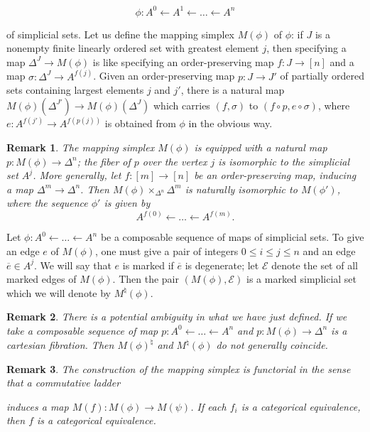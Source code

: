 \documentclass[12pt]{amsart}
\newcommand{\8}{\ensuremath{\infty}}
\newtheorem{remark}{Remark}
\begin{document}
$$
  \phi:A^0\leftarrow A^1\leftarrow \dots \leftarrow A^n
$$

of simplicial sets. Let us define the mapping simplex $M(\phi)$ of $\phi$: if $J$ is a nonempty finite linearly ordered set with greatest element $j$, then specifying a map $\Delta^J\rightarrow M(\phi)$ is like specifying an order-preserving map $f:J\rightarrow [n]$ and a map $\sigma:\Delta^J\rightarrow A^{f(j)}$. Given an order-preserving map $p:J\rightarrow J'$ of partially ordered sets containing largest elements $j$ and $j'$, there is a natural map $M(\phi)(\Delta^{J'})\rightarrow M(\phi)(\Delta^J)$ which carries $(f,\sigma)$ to $(f\circ p, e\circ\sigma)$, where $e:A^{f(j')}\rightarrow A^{f(p(j))}$ is obtained from $\phi$ in the obvious way.

\begin{remark}
  The mapping simplex $M(\phi)$ is equipped with a natural map $p:M(\phi)\rightarrow \Delta^n$; the fiber of $p$ over the vertex $j$ is isomorphic to the simplicial set $A^j$. More generally, let $f:[m]\rightarrow [n]$ be an order-preserving map, inducing a map $\Delta^m\rightarrow \Delta^n$. Then $M(\phi)\times_{\Delta^n}\Delta^m$ is naturally isomorphic to $M(\phi')$, where the sequence $\phi'$ is given by
  $$
    A^{f(0)}\leftarrow\dots\leftarrow A^{f(m)}.
  $$
\end{remark}

Let $\phi:A^0\leftarrow \dots\leftarrow A^n$ be a composable sequence of maps of simplicial sets. To give an edge $e$ of $M(\phi)$, one must give a pair of integers $0\leq i\leq j\leq n$ and an edge $\overline{e}\in A^j$. We will say that $e$ is marked if $\overline{e}$ is degenerate; let $\mathcal{E}$ denote the set of all marked edges of $M(\phi)$. Then the pair $(M(\phi),\mathcal{E})$ is a marked simplicial set which we will denote by $M^\natural(\phi)$.

\begin{remark}
  There is a potential ambiguity in what we have just defined. If we take a composable sequence of map $p:A^0\leftarrow\dots\leftarrow A^n$ and $p:M(\phi)\rightarrow \Delta^n$ is a cartesian fibration. Then $M(\phi)^\natural$ and $M^\natural(\phi)$ do not generally coincide.
\end{remark}

\begin{remark}
  The construction of the mapping simplex is functorial in the sense that a commutative ladder
  induces a map $M(f):M(\phi)\rightarrow M(\psi)$. If each $f_i$ is a categorical equivalence, then $f$ is a categorical equivalence.
\end{remark}
\end{document}
